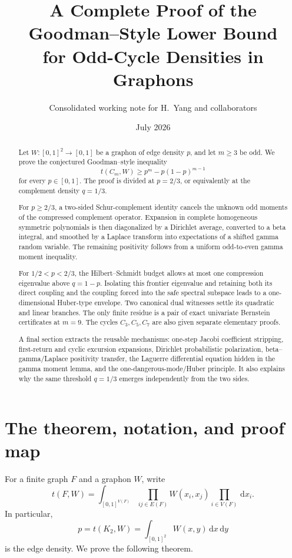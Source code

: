 \documentclass[11pt]{article}
\title{A Complete Proof of the Goodman--Style Lower Bound\\
       for Odd-Cycle Densities in Graphons}
\author{Consolidated working note for H.~Yang and collaborators}
\date{July 2026}
\newcommand{\dd}{\,\mathrm d}
\begin{document}
\maketitle

\begin{abstract}
Let \(W:[0,1]^2\to[0,1]\) be a graphon of edge density \(p\), and let
\(m\ge3\) be odd.  We prove the conjectured Goodman--style inequality
\[
       t(C_m,W)\ge p^m-p(1-p)^{m-1}
\]
for every \(p\in[0,1]\).  The proof is divided at \(p=2/3\), or equivalently
at the complement density \(q=1/3\).

For \(p\ge2/3\), a two-sided Schur-complement identity cancels the unknown
odd moments of the compressed complement operator.  Expansion in complete
homogeneous symmetric polynomials is then diagonalized by a Dirichlet
average, converted to a beta integral, and smoothed by a Laplace transform
into expectations of a shifted gamma random variable.  The remaining
positivity follows from a uniform odd-to-even gamma moment inequality.

For \(1/2<p<2/3\), the Hilbert--Schmidt budget allows at most one compression
eigenvalue above \(q=1-p\).  Isolating this frontier eigenvalue and retaining
both its direct coupling and the coupling forced into the safe spectral
subspace leads to a one-dimensional Huber-type envelope.  Two canonical
dual witnesses settle its quadratic and linear branches.  The only finite
residue is a pair of exact univariate Bernstein certificates at \(m=9\).
The cycles \(C_3,C_5,C_7\) are also given separate elementary proofs.

A final section extracts the reusable mechanisms: one-step Jacobi
coefficient stripping, first-return and cyclic excursion expansions,
Dirichlet probabilistic polarization, beta--gamma/Laplace positivity
transfer, the Laguerre differential equation hidden in the gamma moment
lemma, and the one-dangerous-mode/Huber principle.  It also explains why the
same threshold \(q=1/3\) emerges independently from the two sides.
\end{abstract}

\tableofcontents

\section{The theorem, notation, and proof map}\label{sec:intro}

For a finite graph \(F\) and a graphon \(W\), write
\[
 t(F,W)=\int_{[0,1]^{V(F)}}
          \prod_{ij\in E(F)}W(x_i,x_j)
          \prod_{i\in V(F)}\dd x_i.
\]
In particular,
\[
 p=t(K_2,W)=\int_{[0,1]^2}W(x,y)\dd x\dd y
\]
is the edge density.  We prove the following theorem.
\end{document}
